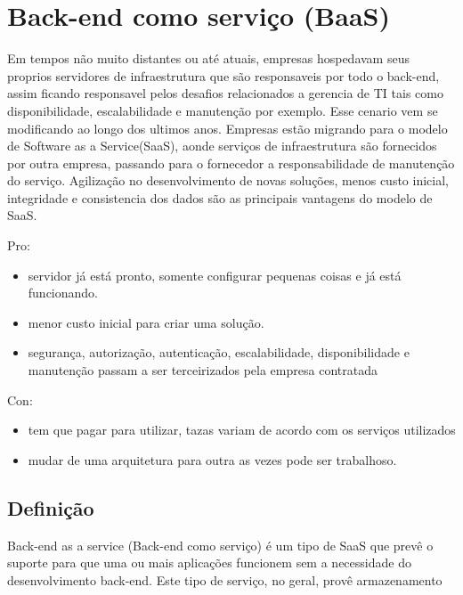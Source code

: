 \chapter{Back-end como serviço (BaaS)}


	Em tempos não muito distantes ou até atuais, empresas hospedavam seus proprios servidores de infraestrutura que são responsaveis por todo o back-end, assim ficando responsavel pelos desafios relacionados a gerencia de TI tais como disponibilidade, escalabilidade e manutenção por exemplo. Esse cenario vem se modificando ao longo dos ultimos anos. Empresas estão migrando para o modelo de Software as a Service(SaaS), aonde serviços de infraestrutura são fornecidos por outra empresa, passando para o fornecedor a responsabilidade de manutenção do serviço. 
	Agilização no desenvolvimento de novas soluções, menos custo inicial, integridade e consistencia dos dados são as principais vantagens do modelo de SaaS.
		
	\noindent Pro:
	\begin{itemize}		
		\item servidor já está pronto, somente configurar pequenas coisas e já está funcionando.
		\item menor custo inicial para criar uma solução.
		\item segurança, autorização, autenticação, escalabilidade, disponibilidade e manutenção passam a ser terceirizados pela empresa contratada
	\end{itemize}

	\noindent Con: 
	\begin{itemize}

		\item tem que pagar para utilizar, tazas variam de acordo com os serviços utilizados
		\item mudar de uma arquitetura para outra as vezes pode ser trabalhoso.
	\end{itemize}

\section{Definição}
	
	Back-end as a service (Back-end como serviço) é um tipo de SaaS que prevê o suporte para que uma ou mais aplicações funcionem sem a necessidade do desenvolvimento back-end. Este tipo de serviço, no geral, provê armazenamento 


